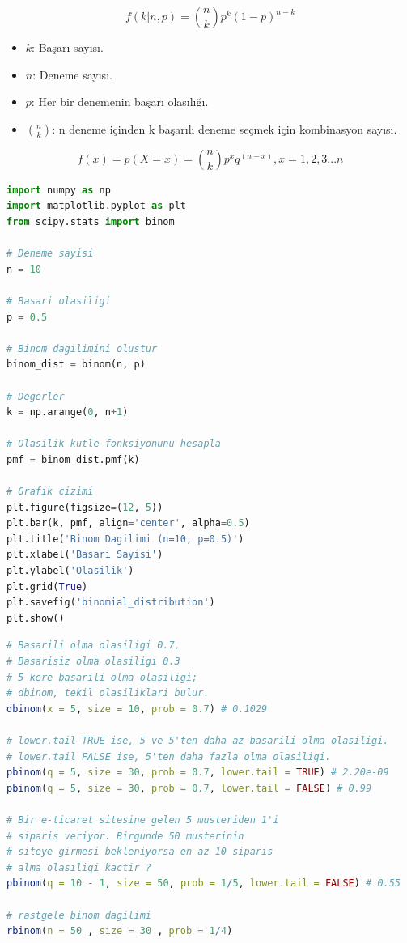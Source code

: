 \[f(k|n,p) = \binom{n}{k} p^k (1-p)^{n-k}\]
\begin{itemize}
	\item $k$: Başarı sayısı.
	\item $n$: Deneme sayısı.
	\item $p$: Her bir denemenin başarı olasılığı.
	\item $\binom{n}{k}$: n deneme içinden k başarılı deneme seçmek için kombinasyon sayısı.
\end{itemize}

\[
f(x) = p(X = x) = \binom{n}{k} p^x q^(n - x), x = 1,2,3...n
\]

\begin{lstlisting}[language=Python]
import numpy as np
import matplotlib.pyplot as plt
from scipy.stats import binom

# Deneme sayisi
n = 10

# Basari olasiligi
p = 0.5

# Binom dagilimini olustur
binom_dist = binom(n, p)

# Degerler
k = np.arange(0, n+1)

# Olasilik kutle fonksiyonunu hesapla
pmf = binom_dist.pmf(k)

# Grafik cizimi
plt.figure(figsize=(12, 5))
plt.bar(k, pmf, align='center', alpha=0.5)
plt.title('Binom Dagilimi (n=10, p=0.5)')
plt.xlabel('Basari Sayisi')
plt.ylabel('Olasilik')
plt.grid(True)
plt.savefig('binomial_distribution')
plt.show()
\end{lstlisting}

\begin{lstlisting}[language=R]
# Basarili olma olasiligi 0.7,
# Basarisiz olma olasiligi 0.3
# 5 kere basarili olma olasiligi;
# dbinom, tekil olasiliklari bulur.
dbinom(x = 5, size = 10, prob = 0.7) # 0.1029

# lower.tail TRUE ise, 5 ve 5'ten daha az basarili olma olasiligi.
# lower.tail FALSE ise, 5'ten daha fazla olma olasiligi.
pbinom(q = 5, size = 30, prob = 0.7, lower.tail = TRUE) # 2.20e-09
pbinom(q = 5, size = 30, prob = 0.7, lower.tail = FALSE) # 0.99

# Bir e-ticaret sitesine gelen 5 musteriden 1'i
# siparis veriyor. Birgunde 50 musterinin
# siteye girmesi bekleniyorsa en az 10 siparis
# alma olasiligi kactir ?
pbinom(q = 10 - 1, size = 50, prob = 1/5, lower.tail = FALSE) # 0.55

# rastgele binom dagilimi
rbinom(n = 50 , size = 30 , prob = 1/4)
\end{lstlisting}

